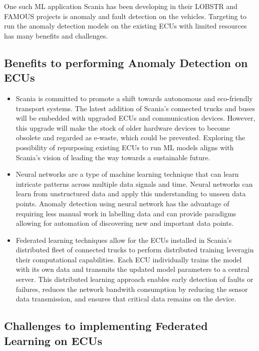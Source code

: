 One such ML application Scania has been developing in their \textsc{LOBSTR} \cite{lobstr} and \textsc{FAMOUS} \cite{famous} projects is anomaly and fault detection on the vehicles. Targeting to run the anomaly detection models on the existing ECUs with limited resources has many benefits and challenges.

\subsection*{Benefits to performing Anomaly Detection on ECUs}

\begin{itemize}
	\item Scania is committed to promote a shift towards autonomous and eco-friendly transport systems. The latest addition of Scania's connected trucks and buses will be embedded with upgraded ECUs and communication devices. However, this upgrade will make the stock of older hardware devices to become obsolete and regarded as e-waste, which could be prevented. Exploring the possibility of repurposing existing ECUs to run ML models aligns with Scania's vision of leading the way towards a sustainable future.
	\item Neural networks are a type of machine learning technique that can learn intricate patterns across multiple data signals and time. Neural networks can learn from unstructured data and apply this understanding to unseen data points. Anomaly detection using neural network has the advantage of requiring less manual work in labelling data and can provide paradigms allowing for automation of discovering new and important data points.
	\item Federated learning techniques allow for the ECUs installed in Scania's distributed fleet of connected trucks to perform distributed training leveragin their computational capabilities. Each ECU individually trains the model with its own data and transmits the updated model parameters to a central server. This distributed learning approach enables early detection of faults or failures, reduces the network bandwith consumption by reducing the sensor data transmission, and ensures that critical data remains on the device.
\end{itemize}

\subsection*{Challenges to implementing Federated Learning on ECUs}

